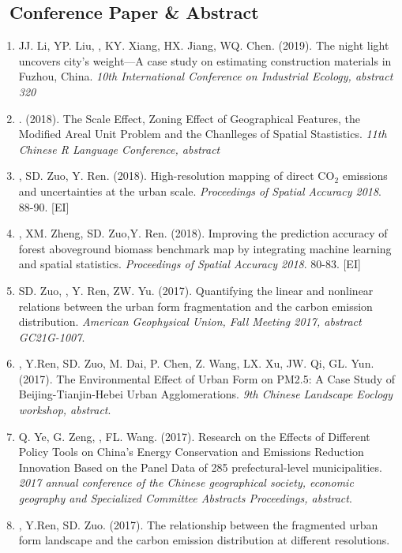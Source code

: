 \subsection*{\texorpdfstring{\faBook\ Conference Paper \& Abstract}{Conference Paper \& Abstract}}
\begin{enumerate}
\item
    JJ. Li, YP. Liu, \Shaoqing, KY. Xiang, HX. Jiang, WQ. Chen. (2019).
    The night light uncovers city’s weight—A case study on estimating construction materials in Fuzhou, China.
    \textit{10th International Conference on Industrial Ecology, abstract 320}
\item
    \Shaoqing. (2018).
    The Scale Effect, Zoning Effect of Geographical Features, the Modified Areal Unit Problem and the Chanlleges of Spatial Stastistics.
    \textit{11th Chinese R Language Conference, abstract}
\item
    \Shaoqing, SD. Zuo, Y. Ren. (2018).
    High-resolution mapping of direct CO$_2$ emissions and uncertainties at the urban scale.
    \textit{Proceedings of Spatial Accuracy 2018}. 88-90. [EI]
\item
    \Shaoqing\CF, XM. Zheng, SD. Zuo,Y. Ren. (2018).
    Improving the prediction accuracy of forest aboveground biomass benchmark map by integrating machine learning and spatial statistics.
    \textit{Proceedings of Spatial Accuracy 2018}. 80-83. [EI]
\item
    SD. Zuo, \Shaoqing, Y. Ren, ZW. Yu. (2017).
    Quantifying the linear and nonlinear relations between the urban form fragmentation and the carbon emission distribution.
    \textit{American Geophysical Union, Fall Meeting 2017, abstract GC21G-1007}.
\item
    \Shaoqing, Y.Ren, SD. Zuo, M. Dai, P. Chen, Z. Wang, LX. Xu, JW. Qi, GL. Yun. (2017).
    The Environmental Effect of Urban Form on PM2.5: A Case Study of Beijing-Tianjin-Hebei Urban Agglomerations.
    \textit{9th Chinese Landscape Eoclogy workshop, abstract}.
\item
    Q. Ye, G. Zeng, \Shaoqing, FL. Wang. (2017).
    Research on the Effects of Different Policy Tools on China’s Energy Conservation and Emissions Reduction Innovation Based on the Panel Data of 285 prefectural-level municipalities.
    \textit{2017 annual conference of the Chinese geographical society, economic geography and Specialized Committee Abstracts Proceedings, abstract}.
\item
    \Shaoqing, Y.Ren, SD. Zuo. (2017).
    The relationship between the fragmented urban form landscape and the carbon emission distribution at different resolutions.

\end{enumerate}
